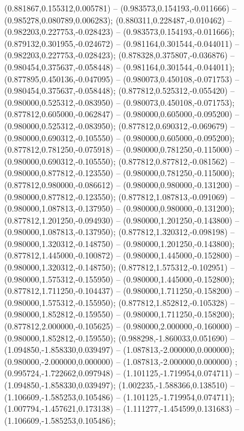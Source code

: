  (0.881867,0.155312,0.005781) -- (0.983573,0.154193,-0.011666) -- (0.985278,0.080789,0.006283);
 (0.880311,0.228487,-0.010462) -- (0.982203,0.227753,-0.028423) -- (0.983573,0.154193,-0.011666);
 (0.879132,0.301955,-0.024672) -- (0.981164,0.301544,-0.044011) -- (0.982203,0.227753,-0.028423);
 (0.878328,0.375807,-0.036876) -- (0.980454,0.375637,-0.058448) -- (0.981164,0.301544,-0.044011);
 (0.877895,0.450136,-0.047095) -- (0.980073,0.450108,-0.071753) -- (0.980454,0.375637,-0.058448);
 (0.877812,0.525312,-0.055420) -- (0.980000,0.525312,-0.083950) -- (0.980073,0.450108,-0.071753);
 (0.877812,0.605000,-0.062847) -- (0.980000,0.605000,-0.095200) -- (0.980000,0.525312,-0.083950);
 (0.877812,0.690312,-0.069679) -- (0.980000,0.690312,-0.105550) -- (0.980000,0.605000,-0.095200);
 (0.877812,0.781250,-0.075918) -- (0.980000,0.781250,-0.115000) -- (0.980000,0.690312,-0.105550);
 (0.877812,0.877812,-0.081562) -- (0.980000,0.877812,-0.123550) -- (0.980000,0.781250,-0.115000);
 (0.877812,0.980000,-0.086612) -- (0.980000,0.980000,-0.131200) -- (0.980000,0.877812,-0.123550);
 (0.877812,1.087813,-0.091069) -- (0.980000,1.087813,-0.137950) -- (0.980000,0.980000,-0.131200);
 (0.877812,1.201250,-0.094930) -- (0.980000,1.201250,-0.143800) -- (0.980000,1.087813,-0.137950);
 (0.877812,1.320312,-0.098198) -- (0.980000,1.320312,-0.148750) -- (0.980000,1.201250,-0.143800);
 (0.877812,1.445000,-0.100872) -- (0.980000,1.445000,-0.152800) -- (0.980000,1.320312,-0.148750);
 (0.877812,1.575312,-0.102951) -- (0.980000,1.575312,-0.155950) -- (0.980000,1.445000,-0.152800);
 (0.877812,1.711250,-0.104437) -- (0.980000,1.711250,-0.158200) -- (0.980000,1.575312,-0.155950);
 (0.877812,1.852812,-0.105328) -- (0.980000,1.852812,-0.159550) -- (0.980000,1.711250,-0.158200);
 (0.877812,2.000000,-0.105625) -- (0.980000,2.000000,-0.160000) -- (0.980000,1.852812,-0.159550);
 (0.988298,-1.860033,0.051690) -- (1.094850,-1.858330,0.039497) -- (1.087813,-2.000000,0.000000);
 (0.980000,-2.000000,0.000000) -- (1.087813,-2.000000,0.000000) ;
 (0.995724,-1.722662,0.097948) -- (1.101125,-1.719954,0.074711) -- (1.094850,-1.858330,0.039497);
 (1.002235,-1.588366,0.138510) -- (1.106609,-1.585253,0.105486) -- (1.101125,-1.719954,0.074711);
 (1.007794,-1.457621,0.173138) -- (1.111277,-1.454599,0.131683) -- (1.106609,-1.585253,0.105486);

